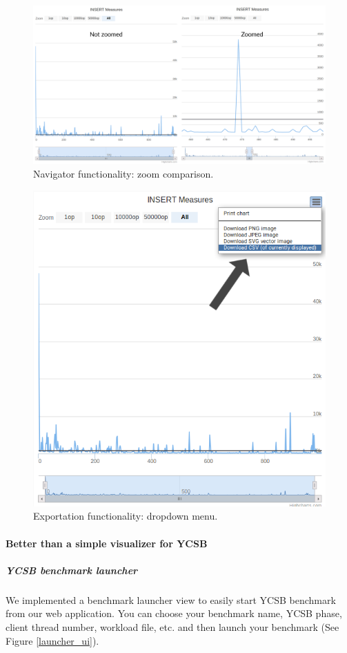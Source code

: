 \documentclass[a4paper,11pt]{report}
\begin{document}
\begin{figure}[ht]
\begin{center}
\includegraphics[width=1\linewidth]{images/chart_not_zoomed_zoomed.png}
\caption{Navigator functionality: zoom comparison.}
\label{chart_not_zoomed_zoomed}
\end{center}
\end{figure}

\begin{figure}[ht]
\begin{center}
\includegraphics[width=0.5\linewidth]{images/chart_exportation.png}
\caption{Exportation functionality: dropdown menu.}
\label{chart_exportation}
\end{center}
\end{figure}

\clearpage

\paragraph{Better than a simple visualizer for YCSB}

\subparagraph{YCSB benchmark launcher}

We implemented a benchmark launcher view to easily start YCSB benchmark from our web application. You can choose your benchmark name, YCSB phase, client thread number, workload file, etc. and then launch your benchmark (See Figure \ref{launcher_ui}).
\end{document}
